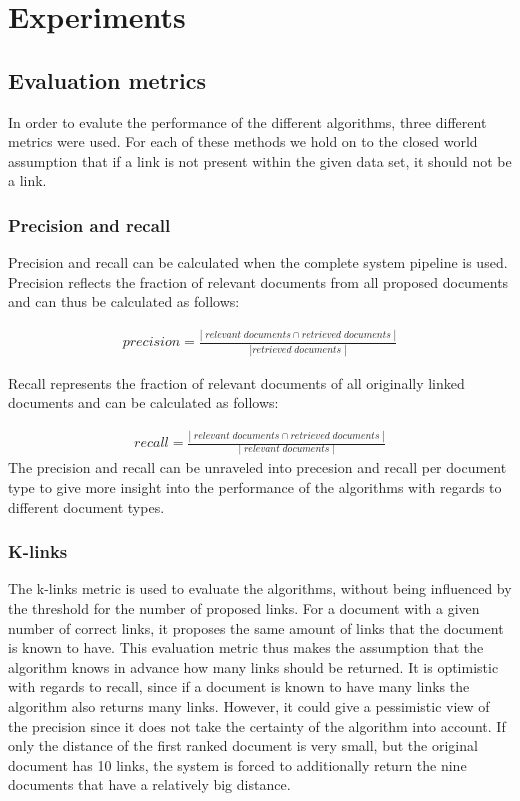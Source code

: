 \section{Experiments}
\subsection{Evaluation metrics}
In order to evalute the performance of the different algorithms, three different metrics were used. For each of these methods we hold on to the closed world assumption that if a link is not present within the given data set, it should not be a link. 

\subsubsection{Precision and recall}
Precision and recall can be calculated when the complete system pipeline is used. Precision reflects the fraction of relevant documents from all proposed documents and can thus be calculated as follows:

\begin{align}
\nonumber precision = \frac{|\;relevant\;documents \cap retrieved\;documents\;|}{|retrieved\;documents\;|}
\end{align}

Recall represents the fraction of relevant documents of all originally linked documents and can be calculated as follows:

\begin{align}
\nonumber recall = \frac{|\;relevant\;documents \cap retrieved\;documents\;|}{|\;relevant\;documents\;|}
\end{align}
The precision and recall can be unraveled into precesion and recall per document type to give more insight into the performance of the algorithms with regards to different document types. 

\subsubsection{K-links}
The k-links metric is used to evaluate the algorithms, without being influenced by the threshold for the number of proposed links. For a document with a given number of correct links, it proposes the same amount of links that the document is known to have. This evaluation metric thus makes the assumption that the algorithm knows in advance how many links should be returned. It is optimistic with regards to recall, since if a document is known to have many links the algorithm also returns many links. However, it could give a pessimistic view of the precision since it does not take the certainty of the algorithm into account. If only the distance of the first ranked document is very small, but the original document has 10 links, the system is forced to additionally return the nine documents that have a relatively big distance. 

